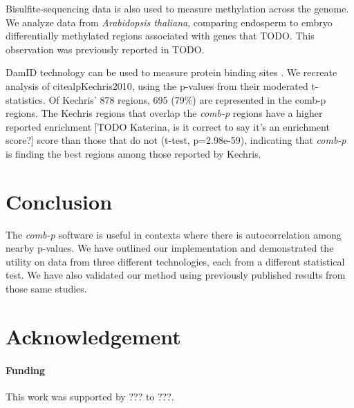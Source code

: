 \documentclass{bioinfo}
\begin{document}
\begin{methods}
Bisulfite-sequencing data is also used to measure methylation across the genome.
We analyze data from {\it Arabidopsis thaliana}, comparing endosperm to embryo
differentially methylated regions associated with genes that TODO.
This observation was previously reported in TODO.

DamID technology can be used to measure protein binding sites \citealp{Steensel2001}.
We recreate analysis of citealp{Kechris2010}, using the p-values from their moderated
t-statistics. Of Kechris' 878 regions, 695 (79\%) are represented in the comb-p regions.
The Kechris regions that overlap the \textit{comb-p} regions have a higher reported
enrichment [TODO Katerina, is it correct to say it's an enrichment score?] score than
those that do not (t-test, p=2.98e-59), indicating that \textit{comb-p} is finding the
best regions among those reported by Kechris.

\end{methods}

\section{Conclusion}
The \textit{comb-p} software is useful in contexts where there is
autocorrelation among nearby p-values. We have outlined our implementation
and demonstrated the utility on data from three different technologies,
each from a different statistical test. We have also validated our method
using previously published results from those same studies.

\section*{Acknowledgement}

\paragraph{Funding\textcolon} This work was supported by ??? to ???.

%
%
%
%
%
%
%
\end{document}
